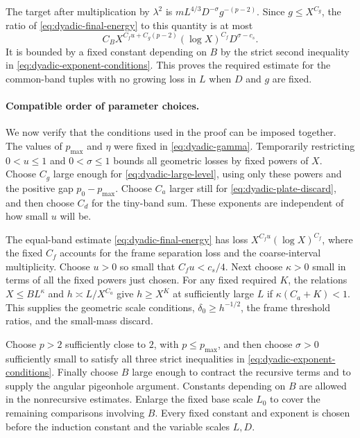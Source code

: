 The target after multiplication by $\lambda^2$ is
$mL^{4/3}D^{-\sigma}g^{-(p-2)}$.  Since $g\leq X^{C_g}$, the ratio
of \eqref{eq:dyadic-final-energy} to this quantity is at most
\[
 C_BX^{C_fu+C_g(p-2)}(\log X)^{C_f}D^{\sigma-c_s}.
\]
It is bounded by a fixed constant depending on $B$ by the strict second
inequality in \eqref{eq:dyadic-exponent-conditions}.  This proves the
required estimate for the common-band tuples with no growing loss in
$L$ when $D$ and $g$ are fixed.

\paragraph{Compatible order of parameter choices.}
We now verify that the conditions used in the proof can be imposed together.
The values of $p_{\max}$ and $\eta$ were fixed in
\eqref{eq:dyadic-gamma}. Temporarily restricting $0<u\leq1$ and
$0<\sigma\leq1$ bounds all geometric losses by fixed powers of $X$.
Choose $C_g$ large enough for \eqref{eq:dyadic-large-level}, using only
these powers and the positive gap $p_0-p_{\max}$. Choose $C_a$ larger
still for \eqref{eq:dyadic-plate-discard}, and then choose $C_d$ for the
tiny-band sum. These exponents are independent of how small $u$ will be.

The equal-band estimate \eqref{eq:dyadic-final-energy} has loss
$X^{C_fu}(\log X)^{C_f}$, where the fixed $C_f$ accounts for the frame
separation loss and the coarse-interval multiplicity. Choose $u>0$ so
small that $C_fu<c_s/4$. Next choose $\kappa>0$ small in terms of all
the fixed powers just chosen. For any fixed required $K$, the relations
$X\leq BL^\kappa$ and $h\asymp L/X^{C_a}$ give $h\geq X^K$ at
sufficiently large $L$ if $\kappa(C_a+K)<1$. This supplies the geometric
scale conditions, $\delta_0\geq h^{-1/2}$, the frame threshold ratios,
and the small-mass discard.

Choose $p>2$ sufficiently close to $2$, with $p\leq p_{\max}$, and
then choose $\sigma>0$ sufficiently small to satisfy all three strict
inequalities in \eqref{eq:dyadic-exponent-conditions}. Finally choose
$B$ large enough to contract the recursive terms and to supply the angular
pigeonhole argument. Constants depending on $B$ are allowed in the
nonrecursive estimates. Enlarge the fixed base scale $L_0$ to cover the
remaining comparisons involving $B$. Every fixed constant and exponent is
chosen before the induction constant and the variable scales $L,D$.

